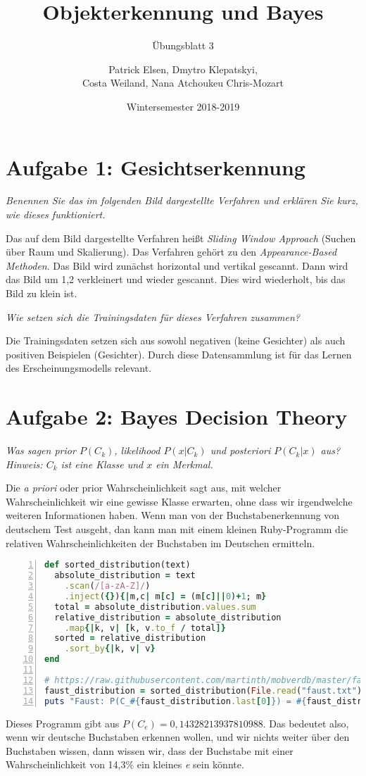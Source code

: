 \documentclass[
  ngerman,
  DIV=14
]{scrartcl}
\title{Objekterkennung und Bayes}
\subtitle{Übungsblatt 3}
\author{Patrick Elsen, Dmytro Klepatskyi,\\Costa Weiland, Nana Atchoukeu Chris-Mozart}
\date{Wintersemester 2018-2019}
\begin{document}
\maketitle

\section*{Aufgabe 1: Gesichtserkennung}

\emph{Benennen Sie das im folgenden Bild dargestellte Verfahren und erklären Sie kurz, wie dieses funktioniert.}

Das auf dem Bild dargestellte Verfahren heißt \emph{Sliding Window Approach} (Suchen über Raum und Skalierung). Das Verfahren gehört zu den \emph{Appearance-Based Methoden}. Das Bild wird zunächst horizontal und vertikal gescannt. Dann wird das Bild um 1,2 verkleinert und wieder gescannt. Dies wird wiederholt, bis das Bild zu klein ist.

\bigskip\noindent
\emph{Wie setzen sich die Trainingsdaten für dieses Verfahren zusammen?}

Die Trainingsdaten setzen sich aus sowohl negativen (keine Gesichter) als auch positiven Beispielen (Gesichter). Durch diese Datensammlung ist für das Lernen des Erscheinungsmodells relevant.

\section*{Aufgabe 2: Bayes Decision Theory}

\emph{Was sagen prior $P(C_k)$, likelihood $P(x|C_k)$ und posteriori $P(C_k|x)$ aus? Hinweis: $C_k$ ist eine Klasse und $x$ ein Merkmal.}

Die \emph{a priori} oder prior Wahrscheinlichkeit sagt aus, mit welcher Wahrscheinlichkeit wir eine gewisse Klasse erwarten, ohne dass wir irgendwelche weiteren Informationen haben. Wenn man von der Buchstabenerkennung von deutschem Test ausgeht, dan kann man mit einem kleinen Ruby-Programm die relativen Wahrscheinlichkeiten der Buchstaben im Deutschen ermitteln. 
\begin{lstlisting}[language=ruby,numbers=left]
def sorted_distribution(text)
  absolute_distribution = text
    .scan(/[a-zA-Z]/)
    .inject({}){|m,c| m[c] = (m[c]||0)+1; m}
  total = absolute_distribution.values.sum
  relative_distribution = absolute_distribution
    .map{|k, v| [k, v.to_f / total]}
  sorted = relative_distribution
    .sort_by{|k, v| v}
end

# https://raw.githubusercontent.com/martinth/mobverdb/master/faust.txt
faust_distribution = sorted_distribution(File.read("faust.txt"))
puts "Faust: P(C_#{faust_distribution.last[0]}) = #{faust_distribution.last[1]}"
\end{lstlisting}
Dieses Programm gibt aus $P(C_e) = 0,14328213937810988$. Das bedeutet also, wenn wir deutsche Buchstaben erkennen wollen, und wir nichts weiter über den Buchstaben wissen, dann wissen wir, dass der Buchstabe mit einer Wahrscheinlichkeit von 14,3\% ein kleines \emph{e} sein könnte.
\end{document}
